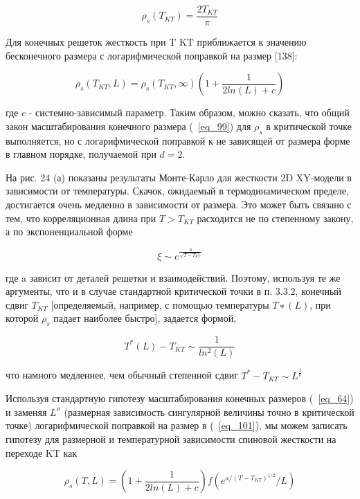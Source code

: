 \documentclass[11pt]{article}
\begin{document}
\begin{equation}
\rho_s(T_{KT})=\frac{2T_{KT}}{\pi} 
\label{eq_100}
\end{equation}

Для конечных решеток жесткость при T KT приближается к значению бесконечного размера с логарифмической поправкой на размер [138]:

\begin{equation}
\rho_s(T_{KT}, L)=\rho_s(T_{KT}, \infty)(1+\frac{1}{2ln(L)+c})
\label{eq_101}
\end{equation}

где $c$ - системно-зависимый параметр. Таким образом, можно сказать, что общий закон масштабирования конечного размера (~\ref{eq_99}) для $\rho_s$ в критической точке выполняется, но с логарифмической поправкой к не зависящей от размера форме в главном порядке, получаемой при $d = 2$.

На рис. 24 (а) показаны результаты Монте-Карло для жесткости 2D XY-модели в зависимости от температуры. Скачок, ожидаемый в термодинамическом пределе, достигается очень медленно в зависимости от размера. Это может быть связано с тем, что корреляционная длина при $T> T_{KT}$ расходится не по степенному закону, а по экспоненциальной форме

\begin{equation}
\xi \sim e^{\frac{a}{\sqrt{T-T_{KT}}}}
\label{eq_102}
\end{equation}

где a зависит от деталей решетки и взаимодействий. Поэтому, используя те же аргументы, что и в случае стандартной критической точки в п. 3.3.2, конечный сдвиг $T_{KT}$ [определяемый, например, с помощью температуры $T ∗ (L)$, при которой $\rho_s$ падает наиболее быстро], задается формой,

\begin{equation}
T^{*}(L)-T_{KT} \sim \frac{1}{ln^2(L)}
\label{eq_103}
\end{equation}

что намного медленнее, чем обычный степенной сдвиг $T^{*} - T_{KT} \sim L^\frac{1}{\nu}$

Используя стандартную гипотезу масштабирования конечных размеров (~\ref{eq_64}) и заменяя $L^{\sigma}$ (размерная зависимость сингулярной величины точно в критической точке) логарифмической поправкой на размер в (~\ref{eq_101}), мы можем записать гипотезу для размерной и температурной зависимости спиновой жесткости на переходе KT как

\begin{equation}
\rho_s(T,L)=(1+\frac{1}{2ln(L)+c})f(e^{a/(T-T_{KT})^{1/2}}/L)
\label{eq_104}
\end{equation}
\end{document}
